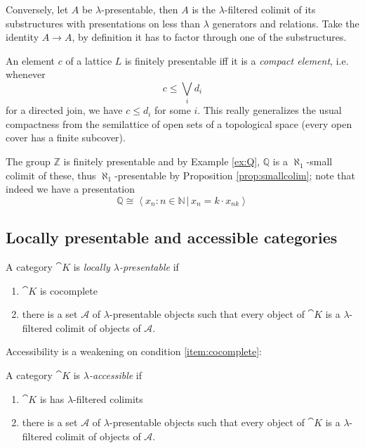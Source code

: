 Conversely, let $A$ be $\lambda$-presentable, then $A$ is the $\lambda$-filtered colimit of its substructures with presentations on less than $\lambda$ generators and relations. Take the identity $A \to A$, by definition it has to factor through one of the substructures.

\begin{Example}
An element $c$ of a lattice $L$ is finitely presentable iff it is a \emph{compact element}, i.e. whenever
\[ c \leq \bigvee_i d_i \]
for a directed join, we have $c \leq d_i$ for some $i$. This really generalizes the usual compactness from the semilattice of open sets of a topological space (every open cover has a finite subcover).
\end{Example}
\begin{Example}
The group $\mathbb Z$ is finitely presentable and by Example \ref{ex:Q}, $\mathbb Q$ is a $\aleph_1$-small colimit of these, thus $\aleph_1$-presentable by Proposition \ref{prop:smallcolim}; note that indeed we have a presentation
\[ \mathbb Q \cong \left\langle x_n : n \in \mathbb N\,|\,x_n = k \cdot x_{nk} \right \rangle\]
\end{Example}

\subsection{Locally presentable and accessible categories}


\begin{Definition}
A category $\cat K$ is \emph{locally $\lambda$-presentable} if
\begin{enumerate}
\item $\cat K$ is cocomplete \label{item:cocomplete}
\item there is a set $\mathcal A$ of $\lambda$-presentable objects such that every object of $\cat K$ is a $\lambda$-filtered colimit of objects of $\mathcal A$.
\end{enumerate}
\end{Definition}

Accessibility is a weakening on condition \ref{item:cocomplete}:

\begin{Definition}
A category $\cat K$ is \emph{$\lambda$-accessible} if
\begin{enumerate}
\item $\cat K$ is has $\lambda$-filtered colimits
\item there is a set $\mathcal A$ of $\lambda$-presentable objects such that every object of $\cat K$ is a $\lambda$-filtered colimit of objects of $\mathcal A$.
\end{enumerate}
\end{Definition}


